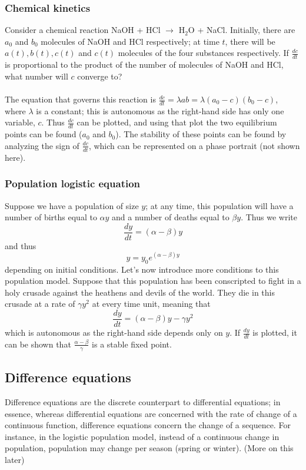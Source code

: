 \documentclass{article}
\begin{document}
\subsubsection{Chemical kinetics}
Consider a chemical reaction NaOH + HCl $\to$ H$_2$O + NaCl. Initially, there are $a_0$ and $b_0$ molecules of NaOH and HCl respectively; at time $t$, there will be $a(t), b(t), c(t)$ and $c(t)$ molecules of the four substances respectively. If $\frac{dc}{dt}$ is proportional to the product of the number of molecules of NaOH and HCl, what number will $c$ converge to?
\\ \\
The equation that governs this reaction is $\frac{dc}{dt} = \lambda a b = \lambda (a_0 - c)(b_0 - c)$, where $\lambda$ is a constant; this is autonomous as the right-hand side has only one variable, $c$. Thus $\frac{dc}{dt}$ can be plotted, and using that plot the two equilibrium points can be found ($a_0$ and $b_0$). The stability of these points can be found by analyzing the sign of $\frac{dc}{dt}$, which can be represented on a phase portrait (not shown here).
\subsubsection{Population logistic equation}
Suppose we have a population of size $y$; at any time, this population will have a number of births equal to $\alpha y$ and a number of deaths equal to $\beta y$. Thus we write
\begin{equation*}
    \frac{dy}{dt} = (\alpha - \beta)y
\end{equation*}
and thus 
\begin{equation*}
    y=y_0 e^{(\alpha - \beta)y}
\end{equation*}
depending on initial conditions. Let's now introduce more conditions to this population model. Suppose that this population has been conscripted to fight in a holy crusade against the heathens and devils of the world. They die in this crusade at a rate of $\gamma y^2$ at every time unit, meaning that
\begin{equation*}
    \frac{dy}{dt} = (\alpha - \beta)y - \gamma y^2
\end{equation*}
which is autonomous as the right-hand side depends only on $y$. If $\frac{dy}{dt}$ is plotted, it can be shown that $\frac{\alpha - \beta}{\gamma}$ is a stable fixed point.
\subsection{Difference equations}
Difference equations are the discrete counterpart to differential equations; in essence, whereas differential equations are concerned with the rate of change of a continuous function, difference equations concern the change of a sequence. For instance, in the logistic population model, instead of a continuous change in population, population may change per season (spring or winter). (More on this later)
\end{document}
